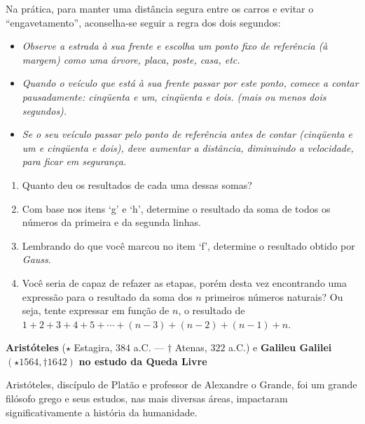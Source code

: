 Na prática, para manter uma distância segura entre os carros e evitar o “engavetamento”, aconselha-se seguir a regra dos dois segundos:
\begin{itemize}
\item {} 
\emph{Observe a estrada à sua frente e escolha um ponto fixo de referência (à margem) como uma árvore, placa, poste, casa, etc.}

\item {} 
\emph{Quando o veículo que está à sua frente passar por este ponto, comece a contar pausadamente: cinqüenta e um, cinqüenta e dois. (mais ou menos dois segundos).}

\item {} 
\emph{Se o seu veículo passar pelo ponto de referência antes de contar (cinqüenta e um e cinqüenta e dois), deve aumentar a distância, diminuindo a velocidade, para ficar em segurança.}

\end{itemize}
\begin{enumerate}
\item {} 
Quanto deu os resultados de cada uma dessas somas?

\item {} 
Com base nos itens ‘g’ e ‘h’, determine o resultado da soma de todos os números da primeira e da segunda linhas.

\item {} 
Lembrando do que você marcou no item ‘f’, determine o resultado obtido por \emph{Gauss}.

\item {} 
Você seria de capaz de refazer as etapas, porém desta vez encontrando uma expressão para o resultado da soma dos \(n\) primeiros números naturais? Ou seja, tente expressar em função de \(n\), o resultado de \(1+2+3+4+5+ \cdots +(n-3)+(n-2)+(n-1)+n\).

\end{enumerate}

\label{\detokenize{AF209-1:sec-org-ideias-galileu-muv}}\label{\detokenize{AF209-1::doc}}\label{\detokenize{AF209-1:organizando-as-ideias-queda-vertical}}
\textbf{Aristóteles} (\(\star\) Estagira, \(384\) a.C. — \(\dagger\) Atenas, \(322\) a.C.) e \textbf{Galileu Galilei} \((\star 1564 , \dagger 1642)\) \textbf{no estudo da Queda Livre}

Aristóteles, discípulo de Platão e professor de Alexandre o Grande, foi um grande filósofo grego e seus estudos, nas mais diversas áreas, impactaram significativamente a história da humanidade.

